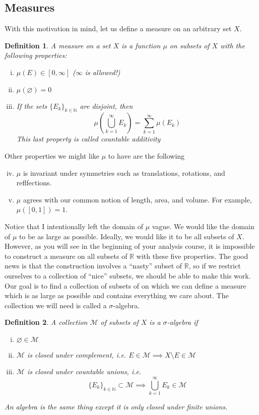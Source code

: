 \documentclass[12pt]{amsart}         %
\newtheorem{definition}{Definition}[section]
\theoremstyle{remark}
\newcommand{\N}{\mathbb{N}}
\newcommand{\R}{\mathbb{R}}
\begin{document}
\subsection{Measures}

With this motivation in mind, let us define a measure on an arbitrary set $X$.

\begin{definition}A \emph{measure} on a set $X$ is a function $\mu$ on subsets of $X$ with the following properties:
\begin{enumerate}[(i)]
\item $\mu(E) \in [0, \infty]$ ($\infty$ is allowed!)
\item $\mu(\varnothing) = 0$
\item If the sets $\{E_k\}_{k \in \N}$ are disjoint, then 
	\begin{equation}
	\mu \left( \bigcup_{k=1}^\infty E_k \right) = \sum_{k=1}^\infty \mu(E_k)
	\end{equation}
	This last property is called \emph{countable additivity}
\end{enumerate}
\end{definition}

Other properties we might like $\mu$ to have are the following
\begin{enumerate}[(i)]\setcounter{enumi}{3}
\item $\mu$ is invariant under symmetries such as translations, rotations, and reflfections.
\item $\mu$ agrees with our common notion of length, area, and volume. For example, $\mu([0,1]) = 1$.
\end{enumerate}

Notice that I intentionally left the domain of $\mu$ vague. We would like the domain of $\mu$ to be as large as possible. Ideally, we would like it to be all subsets of $X$. However, as you will see in the beginning of your analysis course, it is impossible to construct a measure on all subsets of $\R$ with these five properties. The good news is that the construction involves a ``nasty'' subset of $\R$, so if we restrict ourselves to a collection of ``nice'' subsets, we should be able to make this work. Our goal is to find a collection of subsets of on which we can define a measure which is as large as possible and contains everything we care about. The collection we will need is called a $\sigma$-algebra.

\begin{definition}A collection $\mathcal{M}$ of subsets of $X$ is a \emph{$\sigma$-algebra} if 
\begin{enumerate}[(i)]
	\item $\varnothing \in \mathcal{M}$ 
	\item $\mathcal{M}$ is closed under complement, i.e. $E \in \mathcal{M} \implies X\setminus E \in \mathcal{M}$
	\item $\mathcal{M}$ is closed under countable unions, i.e. 
	\[
	\{E_k\}_{k \in \N} \subset \mathcal{M} \implies \bigcup_{k=1}^\infty E_k \in \mathcal{M} 
	\]
\end{enumerate}
An \emph{algebra} is the same thing except it is only closed under finite unions.
\end{definition}
\end{document}
